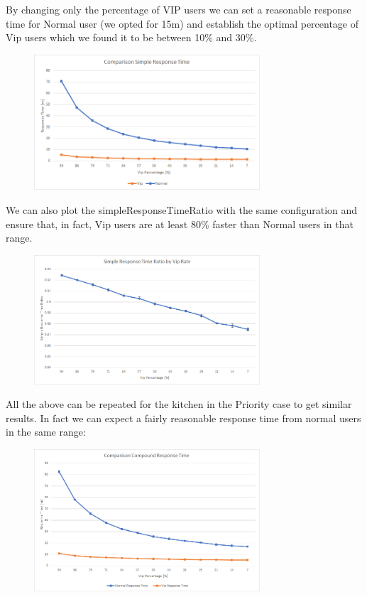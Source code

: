 
 By changing only the percentage of VIP users we can set a reasonable response time for Normal user (we opted for 15m) and establish the optimal percentage of Vip users which we found it to be between 10\% and 30\%.

\begin{figure}[H]
    \centering
    \includegraphics[width=0.75\textwidth]{figs/comparisonSimpleResponseTime.png}
\end{figure}

 We can also plot the simpleResponseTimeRatio with the same configuration and ensure that, in fact, Vip users are at least 80\% faster than Normal users in that range.

\begin{figure}[H]
    \centering
    \includegraphics[width=0.75\textwidth]{figs/simpleResponseTimeRatio.png}
\end{figure}




All the above can be repeated for the kitchen in the Priority case to get similar results. In fact we can expect a fairly reasonable response time from normal users in the same range:

\begin{figure}[H]
    \centering
    \includegraphics[width=0.75\textwidth]{figs/comparisonCompoundResponseTime.png}
\end{figure}
